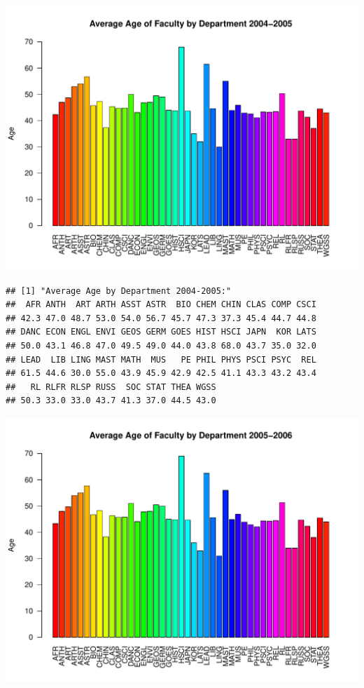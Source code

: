 \documentclass[12pt,a4paper]{article}\usepackage[]{graphicx}\usepackage[]{color}
\makeatletter
\def\maxwidth{ %
  \ifdim\Gin@nat@width>\linewidth
    \linewidth
  \else
    \Gin@nat@width
  \fi
}
\newenvironment{kframe}{%
 \def\at@end@of@kframe{}%
 \ifinner\ifhmode%
  \def\at@end@of@kframe{\end{minipage}}%
  \begin{minipage}{\columnwidth}%
 \fi\fi%
 \def\FrameCommand##1{\hskip\@totalleftmargin \hskip-\fboxsep
 \colorbox{shadecolor}{##1}\hskip-\fboxsep
     \hskip-\linewidth \hskip-\@totalleftmargin \hskip\columnwidth}%
 \MakeFramed {\advance\hsize-\width
   \@totalleftmargin\z@ \linewidth\hsize
   \@setminipage}}%
 {\par\unskip\endMakeFramed%
 \at@end@of@kframe}
\newenvironment{knitrout}{}{} %
\theoremstyle{definition}
\makeatother
\begin{document}
\begin{knitrout}
\color{fgcolor}
\includegraphics[width=\maxwidth]{figure/unnamed-chunk-9-1} 
\begin{kframe}\begin{verbatim}
## [1] "Average Age by Department 2004-2005:"
##  AFR ANTH  ART ARTH ASST ASTR  BIO CHEM CHIN CLAS COMP CSCI 
## 42.3 47.0 48.7 53.0 54.0 56.7 45.7 47.3 37.3 45.4 44.7 44.8 
## DANC ECON ENGL ENVI GEOS GERM GOES HIST HSCI JAPN  KOR LATS 
## 50.0 43.1 46.8 47.0 49.5 49.0 44.0 43.8 68.0 43.7 35.0 32.0 
## LEAD  LIB LING MAST MATH  MUS   PE PHIL PHYS PSCI PSYC  REL 
## 61.5 44.6 30.0 55.0 43.9 45.9 42.9 42.5 41.1 43.3 43.2 43.4 
##   RL RLFR RLSP RUSS  SOC STAT THEA WGSS 
## 50.3 33.0 33.0 43.7 41.3 37.0 44.5 43.0
\end{verbatim}
\end{kframe}
\includegraphics[width=\maxwidth]{figure/unnamed-chunk-9-2} 

\end{knitrout}
\end{document}
